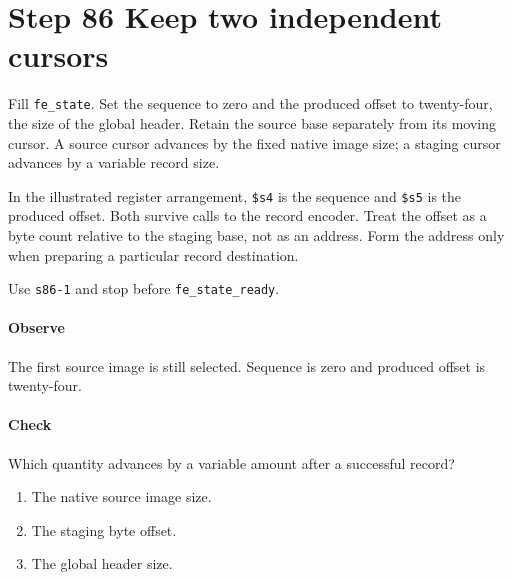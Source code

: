 \section{Step 86 Keep two independent cursors}
Fill \texttt{fe\_state}. Set the sequence to zero and the produced offset to twenty-four, the size of the global header. Retain the source base separately from its moving cursor. A source cursor advances by the fixed native image size; a staging cursor advances by a variable record size.

In the illustrated register arrangement, \texttt{\$s4} is the sequence and \texttt{\$s5} is the produced offset. Both survive calls to the record encoder. Treat the offset as a byte count relative to the staging base, not as an address. Form the address only when preparing a particular record destination.

Use \texttt{s86-1} and stop before \texttt{fe\_state\_ready}.

\paragraph{Observe} The first source image is still selected. Sequence is zero and produced offset is twenty-four.

\paragraph{Check} Which quantity advances by a variable amount after a successful record?
\begin{enumerate}[label=\Alph*.]
  \item The native source image size.
  \item The staging byte offset.
  \item The global header size.
\end{enumerate}
